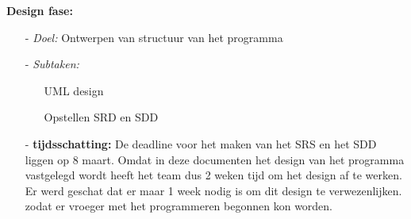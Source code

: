 \documentclass{article}
\begin{document}
\textbf{Design fase:}
\begin{itemize}
\item[-] \textit{Doel:} Ontwerpen van structuur van het programma \\[-5mm]
\item[-] \textit{Subtaken:}\\[-5mm]
\begin{itemize}
	\item[] UML design\\[-5mm]
	\item[]Opstellen SRD en SDD\\[-5mm]
\end{itemize}
\item[-] \textbf{tijdsschatting:}	De deadline voor het maken van het SRS en het SDD liggen op 8 maart. Omdat in deze documenten het design van het programma vastgelegd wordt heeft het team dus 2 weken tijd om het design af te werken. Er werd geschat dat er maar 1 week nodig is om dit design te verwezenlijken. zodat er vroeger met het programmeren begonnen kon worden.\\[-5mm]
\end{itemize}
\end{document}
